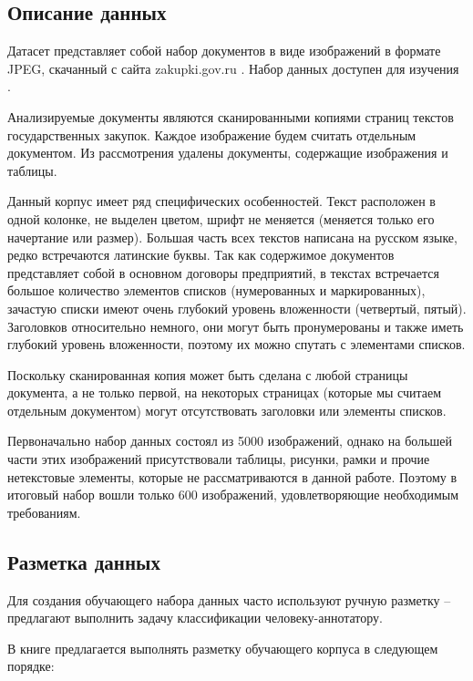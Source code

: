\subsection{Описание данных}

Датасет представляет собой набор документов в виде изображений в формате JPEG, скачанный с сайта zakupki.gov.ru \cite{zakupki}. Набор данных доступен для изучения \cite{data}. 

Анализируемые документы являются сканированными копиями страниц текстов государственных закупок. Каждое изображение будем считать отдельным документом. Из рассмотрения удалены документы, содержащие изображения и таблицы.

Данный корпус имеет ряд специфических особенностей. Текст расположен в одной колонке, не выделен цветом, шрифт не меняется (меняется только его начертание или размер). Большая часть всех текстов написана на русском языке, редко встречаются латинские буквы. Так как содержимое документов представляет собой в основном договоры предприятий, в текстах встречается большое количество элементов списков (нумерованных и маркированных), зачастую списки имеют очень глубокий уровень вложенности (четвертый, пятый). Заголовков относительно немного, они могут быть пронумерованы и также иметь глубокий уровень вложенности, поэтому их можно спутать с элементами списков.

Поскольку сканированная копия может быть сделана с любой страницы документа, а не только первой, на некоторых страницах (которые мы считаем отдельным документом) могут отсутствовать заголовки или элементы списков.

Первоначально набор данных состоял из 5000 изображений, однако на большей части этих изображений присутствовали таблицы, рисунки, рамки и прочие нетекстовые элементы, которые не рассматриваются в данной работе. Поэтому в итоговый набор вошли только 600 изображений, удовлетворяющие необходимым требованиям.



\subsection{Разметка данных}
Для создания обучающего набора данных часто используют ручную разметку -- предлагают выполнить задачу классификации человеку-аннотатору. 

В книге \cite{pustejovsky2012natural} предлагается выполнять разметку обучающего корпуса в следующем порядке:


